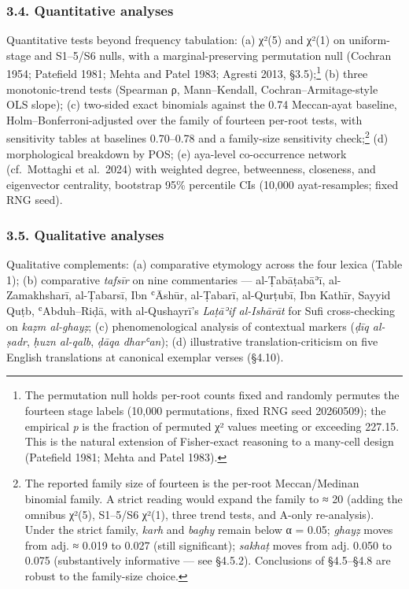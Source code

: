 \documentclass[11pt,a4paper]{article}
\begin{document}
\subsubsection{3.4. Quantitative analyses}\label{quantitative-analyses}

Quantitative tests beyond frequency tabulation: (a) χ²(5) and χ²(1) on
uniform-stage and S1--5/S6 nulls, with a marginal-preserving permutation
null (Cochran 1954; Patefield 1981; Mehta and Patel 1983; Agresti 2013,
§3.5);\footnote{The permutation null holds per-root counts fixed and
  randomly permutes the fourteen stage labels (10,000 permutations,
  fixed RNG seed 20260509); the empirical \emph{p} is the fraction of
  permuted χ² values meeting or exceeding 227.15. This is the natural
  extension of Fisher-exact reasoning to a many-cell design (Patefield
  1981; Mehta and Patel 1983).} (b) three monotonic-trend tests
(Spearman ρ, Mann--Kendall, Cochran--Armitage-style OLS slope); (c)
two-sided exact binomials against the 0.74 Meccan-ayat baseline,
Holm--Bonferroni-adjusted over the family of fourteen per-root tests,
with sensitivity tables at baselines 0.70--0.78 and a family-size
sensitivity check;\footnote{The reported family size of fourteen is the
  per-root Meccan/Medinan binomial family. A strict reading would expand
  the family to ≈ 20 (adding the omnibus χ²(5), S1--5/S6 χ²(1), three
  trend tests, and A-only re-analysis). Under the strict family,
  \emph{karh} and \emph{baghy} remain below α = 0.05; \emph{ghayẓ} moves
  from adj. ≈ 0.019 to 0.027 (still significant); \emph{sakhaṭ} moves
  from adj. 0.050 to 0.075 (substantively informative --- see §4.5.2).
  Conclusions of §4.5--§4.8 are robust to the family-size choice.} (d)
morphological breakdown by POS; (e) aya-level co-occurrence network
(cf.~Mottaghi et al.~2024) with weighted degree, betweenness, closeness,
and eigenvector centrality, bootstrap 95\% percentile CIs (10,000
ayat-resamples; fixed RNG seed).

\subsubsection{3.5. Qualitative analyses}\label{qualitative-analyses}

Qualitative complements: (a) comparative etymology across the four
lexica (Table 1); (b) comparative \emph{tafsīr} on nine commentaries ---
al-Ṭabāṭabāʾī, al-Zamakhsharī, al-Ṭabarsī, Ibn ʿĀshūr, al-Ṭabarī,
al-Qurṭubī, Ibn Kathīr, Sayyid Quṭb, ʿAbduh--Riḍā, with al-Qushayrī's
\emph{Laṭāʾif al-Ishārāt} for Sufi cross-checking on \emph{kaẓm
al-ghayẓ}; (c) phenomenological analysis of contextual markers
(\emph{ḍīq al-ṣadr}, \emph{ḥuzn al-qalb}, \emph{ḍāqa dharʿan}); (d)
illustrative translation-criticism on five English translations at
canonical exemplar verses (§4.10).
\end{document}
